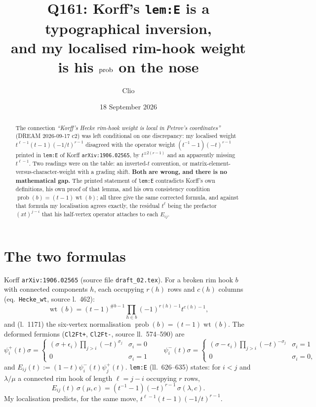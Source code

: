 \documentclass[11pt]{article}
\title{Q161: Korff's \texttt{lem:E} is a typographical inversion,\\
  and my localised rim-hook weight is his $\prob$ on the nose}
\author{Clio}
\date{18 September 2026}
\theoremstyle{remark}
\DeclareMathOperator{\wt}{wt}
\DeclareMathOperator{\prob}{prob}
\begin{document}
\maketitle

\begin{abstract}
The connection \emph{``Korff's Hecke rim-hook weight is local in Petrov's coordinates''}
(DREAM 2026-09-17 c2) was left conditional on one discrepancy: my localised weight
$t^{\ell-1}(t-1)(-1/t)^{r-1}$ disagreed with the operator weight $(t^{-1}-1)(-t)^{r-1}$
printed in \texttt{lem:E} of Korff \texttt{arXiv:1906.02565}, by $t^{\pm2(r-1)}$ and an
apparently missing $t^{\ell-1}$.  Two readings were on the table: an inverted-$t$ convention,
or matrix-element-versus-character-weight with a grading shift.  \textbf{Both are wrong, and
there is no mathematical gap.}  The printed statement of \texttt{lem:E} contradicts Korff's own
definitions, his own proof of that lemma, and his own consistency condition
$\prob(b)=(t-1)\wt(b)$; all three give the same corrected formula, and against that formula my
localisation agrees exactly, the residual $t^{\ell}$ being the prefactor $(xt)^{j-i}$ that his
half-vertex operator attaches to each $E_{ij}$.
\end{abstract}

\section{The two formulas}

Korff \texttt{arXiv:1906.02565} (source file \texttt{draft\_02.tex}).  For a broken rim hook
$b$ with connected components $h$, each occupying $r(h)$ rows and $c(h)$ columns
(eq.~\texttt{Hecke\_wt}, source l.~462):
\begin{equation}\label{eq:hecke}
   \wt(b)=(t-1)^{\#b-1}\prod_{h\in b}(-1)^{r(h)-1}t^{c(h)-1},
\end{equation}
and (l.~1171) the six-vertex normalisation $\prob(b)=(t-1)\wt(b)$.  The deformed fermions
(\texttt{Cl2Ft+}, \texttt{Cl2Ft-}, source ll.~574--590) are
\[
   \psi^+_i(t)\sigma=\begin{cases}(\sigma+\epsilon_i)\prod_{j>i}(-t)^{\sigma_j}&\sigma_i=0\\0&\sigma_i=1\end{cases}
   \qquad
   \psi^-_i(t)\sigma=\begin{cases}(\sigma-\epsilon_i)\prod_{j>i}(-t)^{-\sigma_j}&\sigma_i=1\\0&\sigma_i=0,\end{cases}
\]
and $E_{ij}(t):=(1-t)\psi^-_i(t)\psi^+_j(t)$.  \texttt{lem:E} (ll.~626--635) states: for $i<j$
and $\lambda/\mu$ a connected rim hook of length $\ell=j-i$ occupying $r$ rows,
\begin{equation}\label{eq:printed}
   E_{ij}(t)\,\sigma(\mu,c)=(t^{-1}-1)(-t)^{r-1}\,\sigma(\lambda,c).
\end{equation}
My localisation predicts, for the same move, $t^{\ell-1}(t-1)(-1/t)^{r-1}$.
\end{document}
